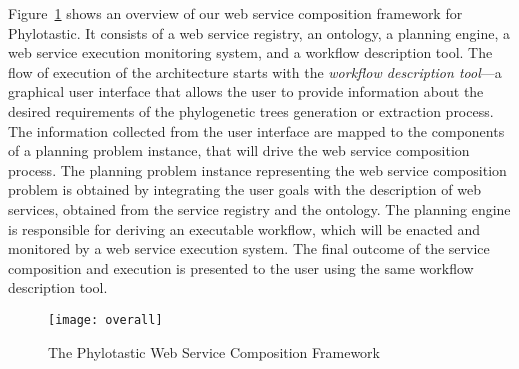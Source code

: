 \documentclass{new_tlp}
\begin{document}
 
Figure~\ref{overview} shows an overview of our web service composition framework for Phylotastic. It consists of
a web service registry, an ontology, a planning engine,  a web service execution monitoring system, and a
workflow description tool. The flow of execution of the architecture starts with the \emph{workflow description tool}---a graphical
user interface that allows the user to provide information about the desired requirements of the phylogenetic trees generation
or extraction process.
The information collected from the user interface are mapped to the components of a planning problem instance, that will drive the
web service composition process. The planning problem instance representing the web service composition problem is obtained by
integrating the user goals with the description of web services, obtained from the service registry and the ontology. The planning engine
is responsible for deriving an executable workflow, which will be enacted and monitored by a web service execution system. The final outcome
of the service composition and execution is presented  to the user using the same workflow description tool.
\begin{figure}[htbp]
  \centering \texttt{[image: overall]}
  \caption{The Phylotastic Web Service Composition Framework}
  \label{overview}
\end{figure}




\end{document}
